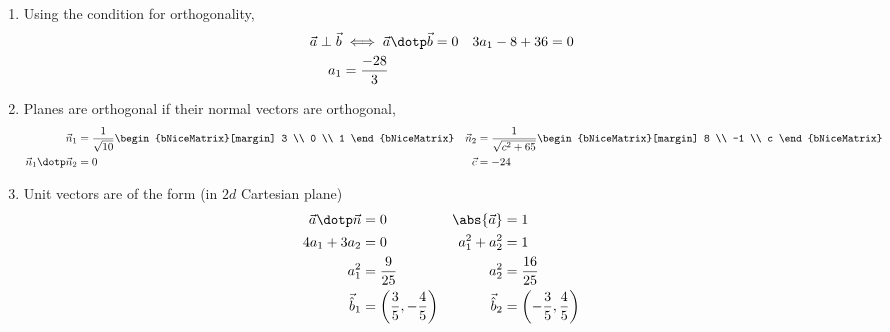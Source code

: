 \begin{enumerate}
    \item Using the condition for orthogonality,
          \begin{align}
              \vec{a} \perp \vec{b} & \iff \vec{a} \dotp \vec{b} = 0 &
              3a_1 - 8 + 36         & = 0                              \\
              a_1                   & = \frac{-28}{3}
          \end{align}

    \item Planes are orthogonal if their normal vectors are orthogonal,
          \begin{align}
              \vec{n}_1                   & = \frac{1}{\sqrt{10}}
              \begin{bNiceMatrix}[margin]
                  3 \\ 0 \\ 1
              \end{bNiceMatrix} &
              \vec{n}_2                   & = \frac{1}{\sqrt{c^2 + 65}}
              \begin{bNiceMatrix}[margin]
                  8 \\ -1 \\ c
              \end{bNiceMatrix}                                  \\
              \vec{n}_1 \dotp \vec{n}_2   & = 0                         &
              \vec{c}                     & = -24
          \end{align}

    \item Unit vectors are of the form (in $2d$ Cartesian plane)
          \begin{align}
              \vec{a} \dotp \vec{n} & = 0                                        &
              \abs{\vec{a}}         & = 1                                          \\
              4a_1 + 3a_2           & = 0                                        &
              a_1^2 + a_2^2         & = 1                                          \\
              a_1^2                 & = \frac{9}{25}                             &
              a_2^2                 & = \frac{16}{25}                              \\
              \vec{\hat{b}}_1       & = \left( \frac{3}{5}, -\frac{4}{5} \right) &
              \vec{\hat{b}}_2       & = \left( -\frac{3}{5}, \frac{4}{5} \right)
          \end{align}


\end{enumerate}
